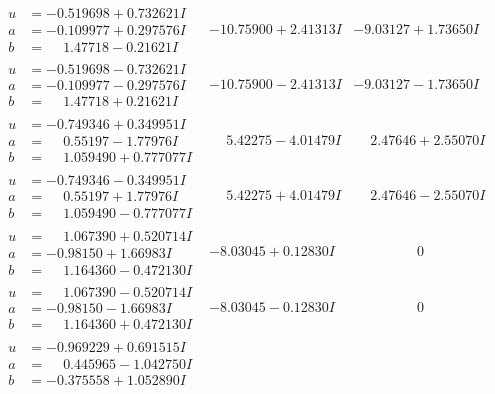 \documentclass[1p]{elsarticle_modified}
\theoremstyle{definition}
\begin{document}
$$\begin{array}{c|c|c}
\begin{aligned}
u &= -0.519698 + 0.732621 I \\
a &= -0.109977 + 0.297576 I \\
b &= \phantom{-}1.47718 - 0.21621 I\end{aligned}
 & -10.75900 + 2.41313 I & -9.03127 + 1.73650 I \\ \hline\begin{aligned}
u &= -0.519698 - 0.732621 I \\
a &= -0.109977 - 0.297576 I \\
b &= \phantom{-}1.47718 + 0.21621 I\end{aligned}
 & -10.75900 - 2.41313 I & -9.03127 - 1.73650 I \\ \hline\begin{aligned}
u &= -0.749346 + 0.349951 I \\
a &= \phantom{-}0.55197 - 1.77976 I \\
b &= \phantom{-}1.059490 + 0.777077 I\end{aligned}
 & \phantom{-}5.42275 - 4.01479 I & \phantom{-}2.47646 + 2.55070 I \\ \hline\begin{aligned}
u &= -0.749346 - 0.349951 I \\
a &= \phantom{-}0.55197 + 1.77976 I \\
b &= \phantom{-}1.059490 - 0.777077 I\end{aligned}
 & \phantom{-}5.42275 + 4.01479 I & \phantom{-}2.47646 - 2.55070 I \\ \hline\begin{aligned}
u &= \phantom{-}1.067390 + 0.520714 I \\
a &= -0.98150 + 1.66983 I \\
b &= \phantom{-}1.164360 - 0.472130 I\end{aligned}
 & -8.03045 + 0.12830 I & \phantom{-0.000000 } 0 \\ \hline\begin{aligned}
u &= \phantom{-}1.067390 - 0.520714 I \\
a &= -0.98150 - 1.66983 I \\
b &= \phantom{-}1.164360 + 0.472130 I\end{aligned}
 & -8.03045 - 0.12830 I & \phantom{-0.000000 } 0 \\ \hline\begin{aligned}
u &= -0.969229 + 0.691515 I \\
a &= \phantom{-}0.445965 - 1.042750 I \\
b &= -0.375558 + 1.052890 I\end{aligned}

\end{array}$$
\end{document}

